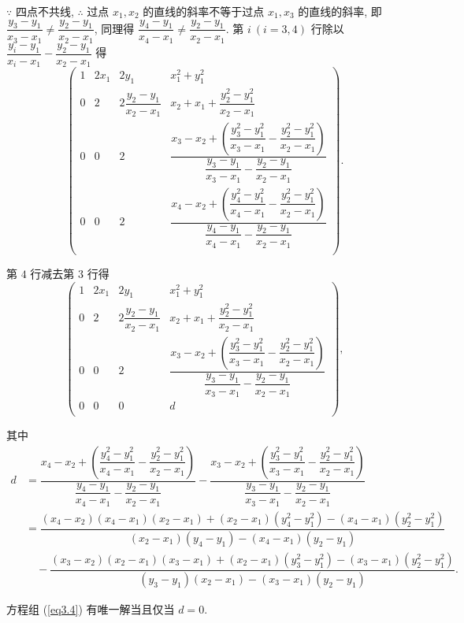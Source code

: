 \documentclass{ctexart}
\begin{document}
\begin{solution}
    $\because$ 四点不共线, $\therefore$ 过点 $x_1,x_2$ 的直线的斜率不等于过点 $x_1,x_3$ 的直线的斜率, 即 $\dfrac{y_3-y_1}{x_3-x_1}\neq\dfrac{y_2-y_1}{x_2-x_1}$, 同理得 $\dfrac{y_4-y_1}{x_4-x_1}\neq\dfrac{y_2-y_1}{x_2-x_1}$. 第 $i\ (i=3,4)$ 行除以 $\dfrac{y_i-y_1}{x_i-x_1}-\dfrac{y_2-y_1}{x_2-x_1}$ 得
    \[\begin{pmatrix}
        1 & 2x_1 & 2y_1 & x_1^2+y_1^2 \\
        0 & 2 & 2\dfrac{y_2-y_1}{x_2-x_1} & x_2+x_1+\dfrac{y_2^2-y_1^2}{x_2-x_1} \\[16pt]
        0 & 0 & 2 & \dfrac{x_3-x_2+\left(\dfrac{y_3^2-y_1^2}{x_3-x_1}-\dfrac{y_2^2-y_1^2}{x_2-x_1}\right)}{\dfrac{y_3-y_1}{x_3-x_1}-\dfrac{y_2-y_1}{x_2-x_1}} \\[16pt]
        0 & 0 & 2 & \dfrac{x_4-x_2+\left(\dfrac{y_4^2-y_1^2}{x_4-x_1}-\dfrac{y_2^2-y_1^2}{x_2-x_1}\right)}{\dfrac{y_4-y_1}{x_4-x_1}-\dfrac{y_2-y_1}{x_2-x_1}} \\[16pt]
    \end{pmatrix}.\]

    第 $4$ 行减去第 $3$ 行得
    \[\begin{pmatrix}
        1 & 2x_1 & 2y_1 & x_1^2+y_1^2 \\
        0 & 2 & 2\dfrac{y_2-y_1}{x_2-x_1} & x_2+x_1+\dfrac{y_2^2-y_1^2}{x_2-x_1} \\[8pt]
        0 & 0 & 2 & \dfrac{x_3-x_2+\left(\dfrac{y_3^2-y_1^2}{x_3-x_1}-\dfrac{y_2^2-y_1^2}{x_2-x_1}\right)}{\dfrac{y_3-y_1}{x_3-x_1}-\dfrac{y_2-y_1}{x_2-x_1}} \\[16pt]
        0 & 0 & 0 & d \\
    \end{pmatrix},\]

    其中
    \begin{align*}
        d & =\dfrac{x_4-x_2+\left(\dfrac{y_4^2-y_1^2}{x_4-x_1}-\dfrac{y_2^2-y_1^2}{x_2-x_1}\right)}{\dfrac{y_4-y_1}{x_4-x_1}-\dfrac{y_2-y_1}{x_2-x_1}}-\dfrac{x_3-x_2+\left(\dfrac{y_3^2-y_1^2}{x_3-x_1}-\dfrac{y_2^2-y_1^2}{x_2-x_1}\right)}{\dfrac{y_3-y_1}{x_3-x_1}-\dfrac{y_2-y_1}{x_2-x_1}} \\
        & =\dfrac{(x_4-x_2)(x_4-x_1)(x_2-x_1)+(x_2-x_1)(y_4^2-y_1^2)-(x_4-x_1)(y_2^2-y_1^2)}{(x_2-x_1)(y_4-y_1)-(x_4-x_1)(y_2-y_1)} \\
        & \quad-\dfrac{(x_3-x_2)(x_2-x_1)(x_3-x_1)+(x_2-x_1)(y_3^2-y_1^2)-(x_3-x_1)(y_2^2-y_1^2)}{(y_3-y_1)(x_2-x_1)-(x_3-x_1)(y_2-y_1)}.
    \end{align*}

    方程组 (\ref{eq3.4}) 有唯一解当且仅当 $d=0$.
\end{solution}
\end{document}
